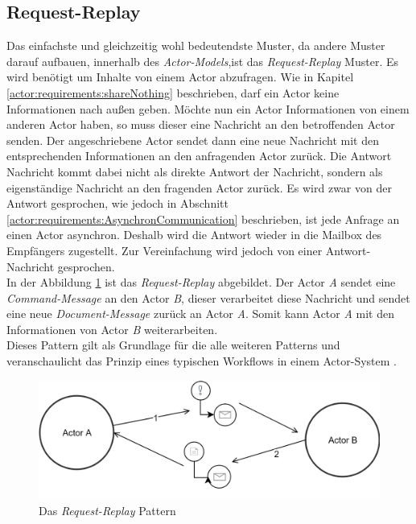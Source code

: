 \subsection{Request-Replay} 
Das einfachste und gleichzeitig wohl bedeutendste Muster, da andere Muster darauf aufbauen, innerhalb des \textit{Actor-Models},ist das \textit{Request-Replay} Muster. Es wird benötigt um Inhalte von einem Actor abzufragen. Wie in Kapitel \ref{actor:requirements:shareNothing} beschrieben, darf ein Actor keine Informationen nach außen geben. Möchte nun ein Actor Informationen von einem anderen Actor haben, so muss dieser eine Nachricht an den betroffenden Actor senden. Der angeschriebene Actor sendet dann eine neue Nachricht mit den entsprechenden Informationen an den anfragenden Actor zurück. Die Antwort Nachricht kommt dabei nicht als direkte Antwort der Nachricht, sondern als eigenständige Nachricht an den fragenden Actor zurück. Es wird zwar von der Antwort gesprochen, wie jedoch in Abschnitt \ref{actor:requirements:AsynchronCommunication} beschrieben, ist jede Anfrage an einen Actor asynchron. Deshalb wird die Antwort wieder in die Mailbox des Empfängers zugestellt. Zur Vereinfachung wird jedoch von einer Antwort-Nachricht gesprochen. \\
In der Abbildung \ref{fig:actor:patterns:requestReplay} ist das \textit{Request-Replay} abgebildet. Der Actor \textit{A} sendet eine \textit{Command-Message} an den Actor \textit{B}, dieser verarbeitet diese Nachricht und sendet eine neue \textit{Document-Message} zurück an Actor \textit{A}. Somit kann Actor \textit{A} mit den Informationen von Actor \textit{B} weiterarbeiten. \\
Dieses Pattern gilt als Grundlage für die alle weiteren Patterns und veranschaulicht das Prinzip eines typischen Workflows in einem Actor-System \citep{Vernon2015ReactiveAkka}.
\begin{figure}
  \centering
  \includegraphics[width=\linewidth]{gfx/actor/patterns/requestReplay}
  \caption{Das \textit{Request-Replay} Pattern}
  \label{fig:actor:patterns:requestReplay}
\end{figure}

